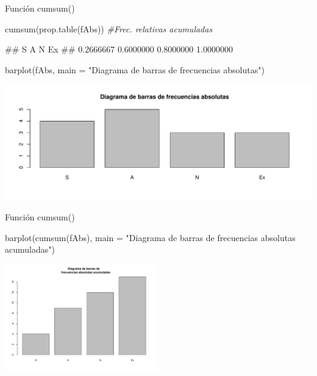 \documentclass[
  ignorenonframetext,
  aspectratio=169]{beamer}
\newenvironment{Shaded}{\begin{snugshade}}{\end{snugshade}}
\newcommand{\AttributeTok}[1]{\textcolor[rgb]{0.77,0.63,0.00}{#1}}
\newcommand{\CommentTok}[1]{\textcolor[rgb]{0.56,0.35,0.01}{\textit{#1}}}
\newcommand{\FunctionTok}[1]{\textcolor[rgb]{0.00,0.00,0.00}{#1}}
\newcommand{\NormalTok}[1]{#1}
\newcommand{\StringTok}[1]{\textcolor[rgb]{0.31,0.60,0.02}{#1}}
\let\oldverbatim\verbatim
\let\endoldverbatim\endverbatim
\renewenvironment{verbatim}{\tiny\oldverbatim}{\endoldverbatim}
\begin{document}
\begin{frame}[fragile]{Función cumsum()}
\protect\hypertarget{funciuxf3n-cumsum-1}{}
\begin{Shaded}
\begin{Highlighting}[]
\FunctionTok{cumsum}\NormalTok{(}\FunctionTok{prop.table}\NormalTok{(fAbs)) }\CommentTok{\#Frec. relativas acumuladas}
\end{Highlighting}
\end{Shaded}

\begin{verbatim}
##         S         A         N        Ex 
## 0.2666667 0.6000000 0.8000000 1.0000000
\end{verbatim}

\begin{Shaded}
\begin{Highlighting}[]
\FunctionTok{barplot}\NormalTok{(fAbs, }\AttributeTok{main =} \StringTok{"Diagrama de barras de frecuencias absolutas"}\NormalTok{)}
\end{Highlighting}
\end{Shaded}

\includegraphics[width=0.8\linewidth]{Hora4_files/figure-beamer/unnamed-chunk-5-1}
\end{frame}

\begin{frame}[fragile]{Función cumsum()}
\protect\hypertarget{funciuxf3n-cumsum-2}{}
\begin{Shaded}
\begin{Highlighting}[]
\FunctionTok{barplot}\NormalTok{(}\FunctionTok{cumsum}\NormalTok{(fAbs), }\AttributeTok{main =} \StringTok{"Diagrama de barras de }
\StringTok{    frecuencias absolutas acumuladas"}\NormalTok{)}
\end{Highlighting}
\end{Shaded}

\begin{center}\includegraphics[width=250px]{Hora4_files/figure-beamer/unnamed-chunk-6-1} \end{center}
\end{frame}
\end{document}
